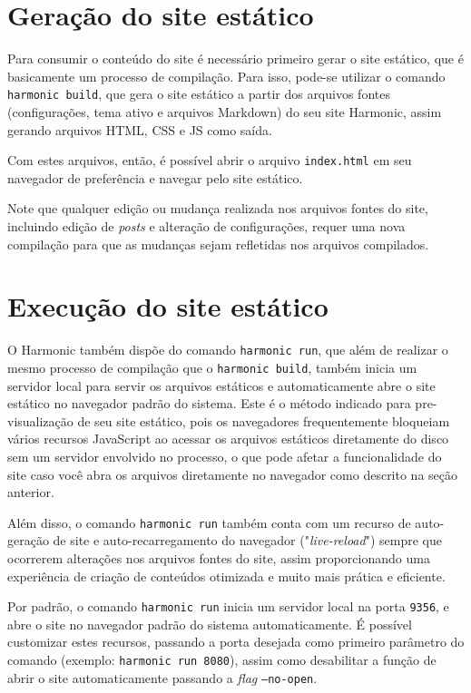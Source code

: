 \documentclass[ppginf, pep]{esinucpel}
\newcommand{\code}[1]{\texttt{#1}}
\begin{document}
\section{Geração do site estático}

Para consumir o conteúdo do site é necessário primeiro gerar o site estático, que é basicamente um processo de compilação. Para isso, pode-se utilizar o comando \code{harmonic build}, que gera o site estático a partir dos arquivos fontes (configurações, tema ativo e arquivos Markdown) do seu site Harmonic, assim gerando arquivos HTML, CSS e JS como saída.

Com estes arquivos, então, é possível abrir o arquivo \code{index.html} em seu navegador de preferência e navegar pelo site estático.

Note que qualquer edição ou mudança realizada nos arquivos fontes do site, incluindo edição de \textit{posts} e alteração de configurações, requer uma nova compilação para que as mudanças sejam refletidas nos arquivos compilados.

\section{Execução do site estático}

O Harmonic também dispõe do comando \code{harmonic run}, que além de realizar o mesmo processo de compilação que o \code{harmonic build}, também inicia um servidor local para servir os arquivos estáticos e automaticamente abre o site estático no navegador padrão do sistema. Este é o método indicado para pre-visualização de seu site estático, pois os navegadores frequentemente bloqueiam vários recursos JavaScript ao acessar os arquivos estáticos diretamente do disco sem um servidor envolvido no processo, o que pode afetar a funcionalidade do site caso você abra os arquivos diretamente no navegador como descrito na seção anterior.

Além disso, o comando \code{harmonic run} também conta com um recurso de auto-geração de site e auto-recarregamento do navegador ("\textit{live-reload}") sempre que ocorrerem alterações nos arquivos fontes do site, assim proporcionando uma experiência de criação de conteúdos otimizada e muito mais prática e eficiente.

Por padrão, o comando \code{harmonic run} inicia um servidor local na porta \code{9356}, e abre o site no navegador padrão do sistema automaticamente. É possível customizar estes recursos, passando a porta desejada como primeiro parâmetro do comando (exemplo: \code{harmonic run 8080}), assim como desabilitar a função de abrir o site automaticamente passando a \textit{flag} \code{--no-open}.
\end{document}
